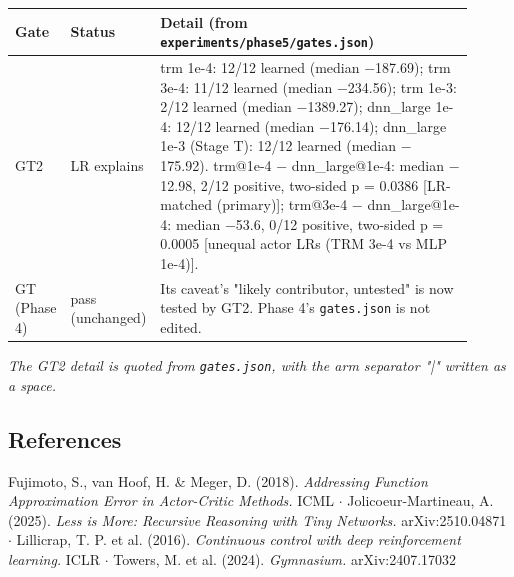 \documentclass[11pt]{article}
\begin{document}
\begin{center}\small\begin{tabular}{>{\raggedright\arraybackslash}p{0.079\linewidth}>{\raggedright\arraybackslash}p{0.115\linewidth}>{\raggedright\arraybackslash}p{0.712\linewidth}}
\toprule
Gate & Status & Detail (from \texttt{experiments/\allowbreak{}phase5/\allowbreak{}gates.\allowbreak{}json}) \\
\midrule
GT2 & LR explains & trm 1e-4: 12/12 learned (median $-$187.69); trm 3e-4: 11/12 learned (median $-$234.56); trm 1e-3: 2/12 learned (median $-$1389.27); dnn\_large 1e-4: 12/12 learned (median $-$176.14); dnn\_large 1e-3 (Stage T): 12/12 learned (median $-$175.92). trm@1e-4 $-$ dnn\_large@1e-4: median $-$12.98, 2/12 positive, two-sided p = 0.0386 [LR-matched (primary)]; trm@3e-4 $-$ dnn\_large@1e-4: median $-$53.6, 0/12 positive, two-sided p = 0.0005 [unequal actor LRs (TRM 3e-4 vs MLP 1e-4)]. \\
GT (Phase 4) & pass (unchanged) & Its caveat's "likely contributor, untested" is now tested by GT2. Phase 4's \texttt{gates.json} is not edited. \\
\bottomrule
\end{tabular}\end{center}



\emph{The GT2 detail is quoted from \texttt{gates.json}, with the arm separator "|" written as a space.}



\subsection*{References}



Fujimoto, S., van Hoof, H. \& Meger, D. (2018). \emph{Addressing Function Approximation Error in Actor-Critic Methods.} ICML $\cdot$ Jolicoeur-Martineau, A. (2025). \emph{Less is More: Recursive Reasoning with Tiny Networks.} arXiv:2510.04871 $\cdot$ Lillicrap, T. P. et al. (2016). \emph{Continuous control with deep reinforcement learning.} ICLR $\cdot$ Towers, M. et al. (2024). \emph{Gymnasium.} arXiv:2407.17032
\end{document}
